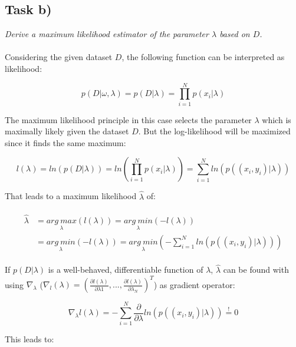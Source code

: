 \documentclass{article}
\begin{document}
\subsection{Task b)}

\textit{Derive a maximum likelihood estimator of the parameter $\lambda$ based on $D$.}\\
\\
Considering the given dataset $D$, the following function can be interpreted as likelihood:

\begin{equation}
p(D|\omega,\lambda) = p(D|\lambda) = \prod_{i=1}^{N} p(x_i|\lambda)
\end{equation}

The maximum likelihood principle in this case selects the parameter $\lambda$ which is maximally likely given the dataset $D$. But the log-likelihood will be maximized since it finds the same maximum:

\begin{equation}
l(\lambda) = ln(p(D|\lambda)) = ln(\prod_{i=1}^{N} p(x_i|\lambda)) = \sum_{i=1}^{N} ln(p((x_i, y_i)|\lambda))
\end{equation}

That leads to a maximum likelihood $\hat{\lambda}$ of:

\begin{align}
\begin{aligned}
\hat{\lambda} 	& = \underset{\lambda}{arg ~ max} (l(\lambda)) = \underset{\lambda}{arg ~ min} (- l(\lambda))\\
			& = \underset{\lambda}{arg ~ min} (- l(\lambda)) = \underset{\lambda}{arg ~ min} (-  \sum_{i=1}^{N} ln(p((x_i, y_i)|\lambda)))
\end{aligned}
\end{align}

If $p(D|\lambda)$ is a well-behaved, differentiable function of $\lambda$, $\hat{\lambda}$ can be found with using $\nabla_\lambda$ ($\nabla_l (\lambda) = (\frac{\partial l(\lambda)}{\partial\lambda1}, . . . , \frac{\partial l(\lambda)}{ \partial\lambda_N})^T$) as gradient operator: 

\begin{equation}\label{eq:mincond}
\nabla_\lambda l(\lambda) = -  \sum_{i=1}^{N} \frac{\partial}{\partial \lambda} ln(p((x_i, y_i)|\lambda)) \overset{!}{=} 0
\end{equation}

This leads to:
\end{document}

